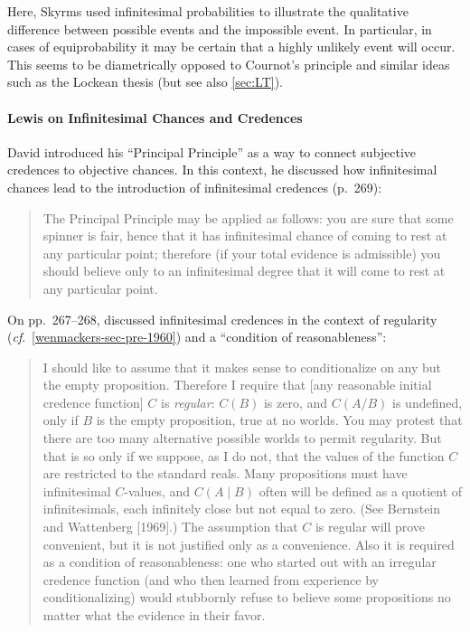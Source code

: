 Here, Skyrms used infinitesimal probabilities to illustrate the qualitative difference between possible events and the impossible event. In particular, in cases of equiprobability it may be certain that a highly unlikely event will occur. This seems to be diametrically opposed to Cournot's principle and similar ideas such as the Lockean thesis (but see also \autoref{sec:LT}).

\paragraph{Lewis on Infinitesimal Chances and Credences}
David \citet{Lewis:1980} introduced his ``Principal Principle'' as a way to connect subjective credences to objective chances. In this context, he discussed how infinitesimal chances lead to the introduction of infinitesimal credences (p.~269):
\begin{quote}
The Principal Principle may be applied as follows: you are sure that some spinner is fair, hence that it has infinitesimal chance of coming to rest at any particular point; therefore (if your total evidence is admissible) you should believe only to an infinitesimal degree that it will come to rest at any particular point.
\end{quote}
On pp.~267--268, \citet{Lewis:1980} discussed infinitesimal credences in the context of regularity (\textit{cf}.\ \autoref{wenmackers-sec-pre-1960}) and a ``condition of reasonableness'':
\begin{quote}
I should like to assume that it makes sense to conditionalize on any but the empty proposition. Therefore I require that [any reasonable initial credence function] $C$ is \textit{regular}: $C(B)$ is zero, and $C(A/B)$ is undefined, only if $B$ is the empty proposition, true at no worlds. You may protest that there are too many alternative possible worlds to permit regularity. But that is so only if we suppose, as I do not, that the values of the function $C$ are restricted to the standard reals. Many propositions must have infinitesimal $C$-values, and $C(A \mid B)$ often will be defined as a quotient of infinitesimals, each infinitely close but not equal to zero. (See Bernstein and Wattenberg [1969].) The assumption that $C$ is regular will prove convenient, but it is not justified only as a convenience. Also it is required as a condition of reasonableness: one who started
out with an irregular credence function (and who then learned from experience by conditionalizing) would stubbornly refuse to believe some propositions no matter what the evidence in their favor.
\end{quote}

